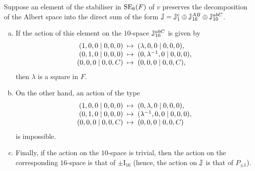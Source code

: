 \begin{lemma}
	\label{lemma:1_2_actions}
	Suppose an element of the stabiliser in $\mathrm{SE}_6(F)$ of $v$ preserves 
	the decomposition of the Albert space into
	the direct sum of the form $\mathbb{J} = \mathbb{J}_{1}^c \oplus \mathbb{J}_{16}^{AB} \oplus \mathbb{J}_{10}^{abC}$.
	
	\begin{enumerate}[(a)]
	\item If the action of this element on the $10$-space $\mathbb{J}_{10}^{abC}$ 
	is given by
	\begin{equation*}
		\begin{array}{r@{\;\;}c@{\;\;}l}
			(1,0,0\mid 0,0,0) & \mapsto & (\lambda,0,0\mid 0,0,0), \\
			(0,1,0\mid 0,0,0) & \mapsto & (0,\lambda^{-1},0\mid 0,0,0), \\
			(0,0,0\mid 0,0,C) & \mapsto & (0,0,0 \mid 0,0,C),
		\end{array}
	\end{equation*}
	then $\lambda$ is a square in $F$. 
	
	\item On the other hand, an action of the type 
	\begin{equation*}
		\begin{array}{r@{\;\;}c@{\;\;}l}
			(1,0,0\mid 0,0,0) & \mapsto & (0,\lambda,0\mid 0,0,0), \\
			(0,1,0\mid 0,0,0) & \mapsto & (\lambda^{-1},0,0\mid 0,0,0), \\
			(0,0,0\mid 0,0,C) & \mapsto & (0,0,0 \mid 0,0,C)
		\end{array}
	\end{equation*}
	is impossible. 
	
	\item Finally, if the action on the $10$-space is 
	trivial, then the action on the corresponding $16$-space is that of $\pm \mathrm{I}_{16}$ 
	(hence, the action on $\mathbb{J}$ is that of $P_{\pm 1}$). 
	
	\end{enumerate}
\end{lemma}

